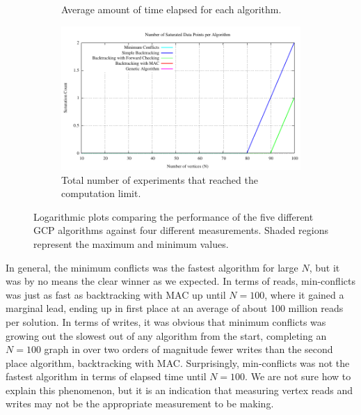 \documentclass{article}
\begin{document}
\begin{figure}[h!]
\begin{subfigure}{0.49\textwidth}
				\caption{Average amount of time elapsed for each algorithm.}
			\end{subfigure}
			\;
			\begin{subfigure}{0.49\textwidth}
				\centering
				\includegraphics[width=\textwidth]{../results_5/comparing_num_saturated}
				\caption{Total number of experiments that reached the computation limit.}
			\end{subfigure}
			\caption{Logarithmic plots comparing the performance of the five different GCP algorithms against four different measurements. Shaded regions represent the maximum and minimum values.}
			\label{results}
		\end{figure}
		
		In general, the minimum conflicts was the fastest algorithm for large $N$, but it was by no means the clear winner as we expected. In terms of reads, min-conflicts was just as fast as backtracking with MAC up until $N=100$, where it gained a marginal lead, ending up in first place at an average of about 100 million reads per solution. In terms of writes, it was obvious that minimum conflicts was growing out the slowest out of any algorithm from the start, completing an $N=100$ graph in over two orders of magnitude fewer writes than the second place algorithm, backtracking with MAC. Surprisingly, min-conflicts was not the fastest algorithm in terms of elapsed time until $N=100$. We are not sure how to explain this phenomenon, but it is an indication that measuring vertex reads and writes may not be the appropriate measurement to be making.
		
\end{document}
